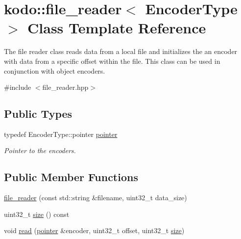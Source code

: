 \hypertarget{classkodo_1_1file__reader}{\section{kodo\-:\-:file\-\_\-reader$<$ Encoder\-Type $>$ Class Template Reference}
\label{classkodo_1_1file__reader}
}


The file reader class reads data from a local file and initializes the an encoder with data from a specific offset within the file. This class can be used in conjunction with object encoders.  




{\ttfamily \#include $<$file\-\_\-reader.\-hpp$>$}

\subsection*{Public Types}
\begin{DoxyCompactItemize}
\item 
\hypertarget{classkodo_1_1file__reader_a7dc0d657094234faff3e06fe015a38a8}{typedef Encoder\-Type\-::pointer \hyperlink{classkodo_1_1file__reader_a7dc0d657094234faff3e06fe015a38a8}{pointer}}\label{classkodo_1_1file__reader_a7dc0d657094234faff3e06fe015a38a8}

\begin{DoxyCompactList}\small\item\em Pointer to the encoders. \end{DoxyCompactList}\end{DoxyCompactItemize}
\subsection*{Public Member Functions}
\begin{DoxyCompactItemize}
\item 
\hyperlink{classkodo_1_1file__reader_a6644494a6ea4f579985f0ad839591f24}{file\-\_\-reader} (const std\-::string \&filename, uint32\-\_\-t data\-\_\-size)
\item 
uint32\-\_\-t \hyperlink{classkodo_1_1file__reader_a8a3ae4570e3203a70a62d6bea9fd835d}{size} () const 
\item 
void \hyperlink{classkodo_1_1file__reader_a0c6c8808397c10ad6abfd3fae6fe415b}{read} (\hyperlink{classkodo_1_1file__reader_a7dc0d657094234faff3e06fe015a38a8}{pointer} \&encoder, uint32\-\_\-t offset, uint32\-\_\-t \hyperlink{classkodo_1_1file__reader_a8a3ae4570e3203a70a62d6bea9fd835d}{size})
\end{DoxyCompactItemize}


